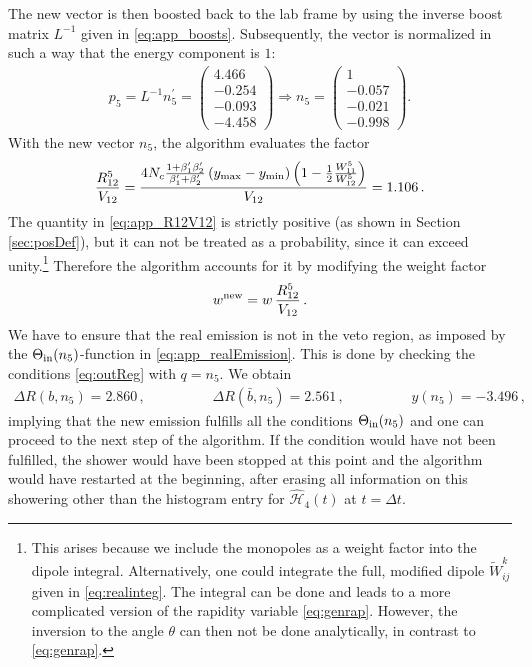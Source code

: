 \documentclass[11pt,a4paper]{article}
\begin{document}
The new vector is then boosted back to the lab frame by using the inverse boost matrix $L^{-1}$ given in \eqref{eq:app_boosts}. Subsequently, the vector is normalized in such a way that the energy component is  $1$:
\begin{align}
p_5=L^{-1}n_5^\prime=\left(\begin{matrix} 4.466\\-0.254\\-0.093\\ -4.458\end{matrix}\right)\Rightarrow n_5=\left(\begin{matrix} 1\\-0.057\\-0.021\\ -0.998\end{matrix}\right)  .
\end{align} 
With the new vector $n_5$, the algorithm evaluates the factor 
\begin{align}
\frac{R_{12}^5}{V_{12}}=  \frac{4 N_c \frac{1+\beta_1^\prime \beta_2^\prime}{\beta_1^\prime+\beta_2^\prime}\left(y_{{\rm max}}-y_{{\rm min}}\right)\left(1-\frac{1}{2}\frac{W_{11}^5}{W_{12}^5}\right)}{V_{12}}=1.106\, . \label{eq:app_R12V12}
\end{align}
The quantity in \eqref{eq:app_R12V12} is strictly positive (as shown in Section \ref{sec:posDef}), but it can not be treated as a probability, since it can exceed unity.\footnote{This arises because we include the monopoles as a weight factor into the dipole integral. Alternatively, one could integrate the full, modified dipole $\widetilde{W}_{ij}^k$ given in \eqref{eq:realinteg}. The integral can be done and leads to a more complicated version of the rapidity variable \eqref{eq:genrap}. However, the inversion to the angle $\theta$ can then not be done analytically, in contrast to \eqref{eq:genrap}.} Therefore the algorithm accounts for it by modifying the weight factor
\begin{align}
w^{{\rm new}}=w\, \frac{R_{12}^5}{V_{12}} \, .
\end{align}
We have to ensure that the real emission is not in the veto region, as imposed by the $\Theta_{\rm in}(n_{5})$-function in \eqref{eq:app_realEmission}. This is done by checking the conditions \eqref{eq:outReg} with $q=n_5$. We obtain
\begin{align}
\Delta R(b,n_5)=2.860 \,, \hspace{2cm} \Delta R(\bar{b},n_5)=2.561 \,, \hspace{2cm} y(n_5)=-3.496 \, ,
\end{align}
implying that the new emission fulfills all the conditions $\Theta_{\rm in}(n_{5})$ and one can proceed to the next step of the algorithm. If the condition would have not been fulfilled, the shower would have been stopped at this point and the algorithm would have restarted at the beginning, after erasing all information on this showering other than the histogram  entry for $\mathcal{\hat{H}}_4(t)$ at $t=\Delta t$.
\end{document}
